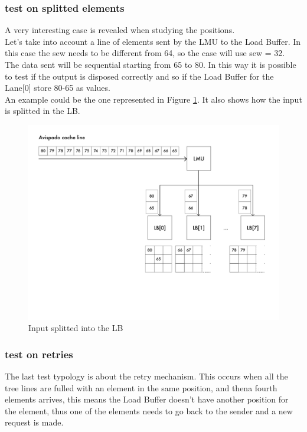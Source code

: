 \subsubsection{test on splitted elements} 
A very interesting case is revealed when studying the positions.\\
Let's take into account a line of elements sent by the LMU to the Load Buffer. In this case the sew needs to be different from 64, so the case will use sew = 32.\\

The data sent will be sequential starting from 65 to 80. In this way it is possible to test if the output is disposed correctly and so if the Load Buffer for the Lane[0] store 80-65 as values.\\

An example could be the one represented in Figure \ref{cache-to-lb-split-ex}. It also shows how the input is splitted in the LB.

\begin{figure}[H]
    \centering
    \includegraphics[scale = 0.6]{Chapter_2/img/cache-to-lb-split-ex.png}
    \caption{Input splitted into the LB}
    \label{cache-to-lb-split-ex}
\end{figure}

\subsubsection{test on retries}
The last test typology is about the retry mechanism. This occurs when all the tree lines are fulled with an element in the same position, and thena fourth elements arrives, this means the Load Buffer doesn't have another position for the element, thus one of the elements needs to go back to the sender and a new request is made.\\

